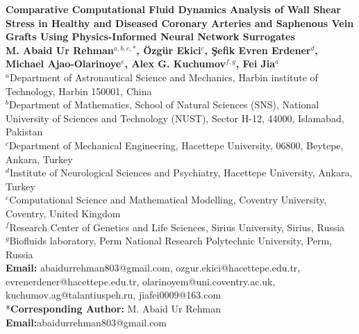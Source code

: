 ﻿\documentclass[12pt,a4paper]{article}
\title{\textbf{}}
\theoremstyle{definition}
\numberwithin{equation}{section}
\begin{document}
\begin{center}
{\Large \bf Comparative Computational Fluid Dynamics Analysis of Wall Shear Stress in Healthy and Diseased Coronary Arteries and Saphenous Vein Grafts Using Physics-Informed Neural Network Surrogates
}\\[12mm]
{\bf M. Abaid Ur Rehman$^{a, b, c,*}$, Özgür  Ekici$^c$, Şefik Evren Erdener$^{d}$, {Michael Ajao-Olarinoye$^e$}, Alex G. Kuchumov$^{f, g}$, Fei Jia$^{a}$}\\[3mm] {$^a$Department of Astronautical Science and Mechanics, Harbin institute of Technology, Harbin 150001, China} \\{$^b$Department of Mathematics, School of Natural Sciences (SNS), National University of Sciences and Technology (NUST), Sector H-12, 44000, Islamabad, Pakistan}\\
{$^c$Department of Mechanical Engineering, Hacettepe University, 06800, Beytepe, Ankara, Turkey}\\{$^d$Institute of Neurological Sciences and Psychiatry, Hacettepe University, Ankara, Turkey}\\{$^e$Computational Science and Mathematical Modelling, Coventry University, Coventry, United Kingdom}\\{$^f$Research Center of Genetics and Life Sciences, Sirius University, Sirius, Russia}\\{$^g$Biofluids laboratory, Perm National Research Polytechnic University, Perm, Russia}\\[3 mm]
{\textbf{Email:} abaidurrehman803@gmail.com, ozgur.ekici@hacettepe.edu.tr, evrenerdener@hacettepe.edu.tr, {olarinoyem@uni.coventry.ac.uk}, kuchumov.ag@talantiuspeh.ru, jiafei0009@163.com}\\
{*{\textbf{Corresponding Author:}} M. Abaid Ur Rehman  \textbf{Email:}abaidurrehman803@gmail.com }

\end{center}
\end{document}
